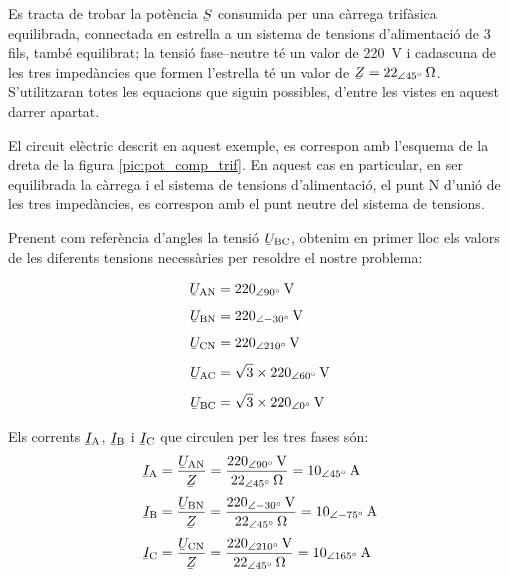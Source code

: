 \begin{exemple}
    Es tracta de trobar la pot\`{e}ncia $\cmplx{S}$ consumida per una c\`{a}rrega
    trif\`{a}sica equilibrada, connectada en estrella a un sistema de tensions
    d'alimentaci\'{o}  de 3 fils, tamb\'{e} equilibrat; la tensi\'{o} fase--neutre
    t\'{e} un valor de \SI{220}{V} i cadascuna de les tres  imped\`{a}ncies
    que formen l'estrella t\'{e} un valor de $\cmplx{Z}=\SIpd{22}{45}{\ohm}$.
     S'utilitzaran totes les equacions que
    siguin possibles, d'entre les vistes en aquest darrer apartat.

    El circuit el\`{e}ctric descrit en aquest exemple, es correspon amb
    l'esquema de la dreta de la figura \vref{pic:pot_comp_trif}. En
    aquest cas en particular, en ser equilibrada la c\`{a}rrega i el
    sistema de tensions d'alimentaci\'{o}, el punt N d'uni\'{o} de  les tres imped\`{a}ncies, es
    correspon amb el punt neutre del sistema de tensions.

    Prenent com refer\`{e}ncia d'angles la tensi\'{o}
    $\cmplx{U}\ped{BC}$, obtenim en primer lloc els valors de
    les diferents tensions necess\`{a}ries per resoldre el nostre
    problema:

    \hfill
    \begin{minipage}[b]{7.5cm}
        
    \end{minipage}
    \hfill
    \begin{minipage}[b][5.7cm][t]{3.8cm}
    \begin{align*}
        \cmplx{U}\ped{AN} &= \SIpd{220}{90}{V} \\[1ex]
        \cmplx{U}\ped{BN} &= \SIpd{220}{-30}{V} \\[1ex]
        \cmplx{U}\ped{CN} &= \SIpd{220}{210}{V} \\[1ex]
        \cmplx{U}\ped{AC} &= \sqrt{3}\times \SIpd{220}{60}{V} \\[1ex]
        \cmplx{U}\ped{BC} &= \sqrt{3}\times \SIpd{220}{0}{V}
    \end{align*}
    \end{minipage}
    \hfill{}

    Els corrents $\cmplx{I}\ped{A}$, $\cmplx{I}\ped{B}$ i $\cmplx{I}\ped{C}$ que
    circulen  per les tres fases s\'{o}n:
    \begin{align*}
        \cmplx{I}\ped{A} &=\frac{\cmplx{U}\ped{AN}}{\cmplx{Z}} =
        \frac{\SIpd{220}{90}{V}}{\SIpd{22}{45}{\ohm}} =
        \SIpd{10}{45}{A}\\[1mm]
        \cmplx{I}\ped{B} &=\frac{\cmplx{U}\ped{BN}}{\cmplx{Z}} =
        \frac{\SIpd{220}{-30}{V}}{\SIpd{22}{45}{\ohm}} =
        \SIpd{10}{-75}{A}\\[1mm]
        \cmplx{I}\ped{C} &=\frac{\cmplx{U}\ped{CN}}{\cmplx{Z}} =
        \frac{\SIpd{220}{210}{V}}{\SIpd{22}{45}{\ohm}} =
        \SIpd{10}{165}{A}
    \end{align*}



\end{exemple}
